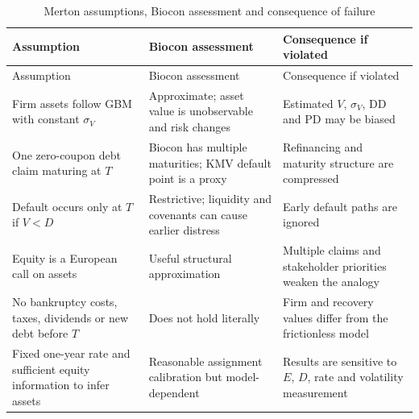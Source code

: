 \documentclass[10pt,a4paper]{article}
\newcommand{\sigV}{\sigma_V}
\begin{document}
\begin{longtable}{p{}p{}p{}}
\caption{Merton assumptions, Biocon assessment and consequence of failure}\\
\toprule Assumption & Biocon assessment & Consequence if violated\\\midrule\endfirsthead
\toprule Assumption & Biocon assessment & Consequence if violated\\\midrule\endhead
Firm assets follow GBM with constant $\sigV$ & Approximate; asset value is unobservable and risk changes & Estimated $V$, $\sigV$, DD and PD may be biased\\
One zero-coupon debt claim maturing at $T$ & Biocon has multiple maturities; KMV default point is a proxy & Refinancing and maturity structure are compressed\\
Default occurs only at $T$ if $V<D$ & Restrictive; liquidity and covenants can cause earlier distress & Early default paths are ignored\\
Equity is a European call on assets & Useful structural approximation & Multiple claims and stakeholder priorities weaken the analogy\\
No bankruptcy costs, taxes, dividends or new debt before $T$ & Does not hold literally & Firm and recovery values differ from the frictionless model\\
Fixed one-year rate and sufficient equity information to infer assets & Reasonable assignment calibration but model-dependent & Results are sensitive to $E$, $D$, rate and volatility measurement\\
\bottomrule
\end{longtable}
\end{document}
